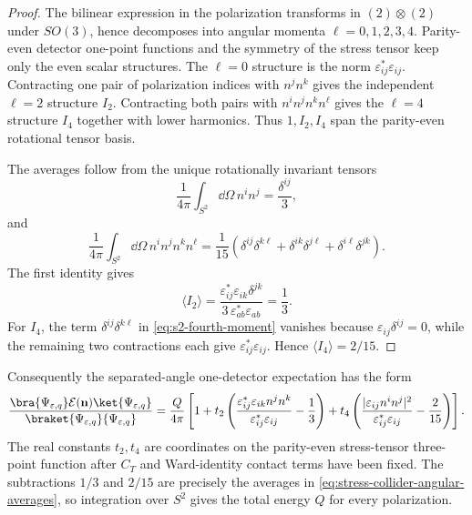 \begin{proof}
The bilinear expression in the polarization transforms in
\((2)\otimes(2)\) under \(SO(3)\), hence decomposes into angular momenta
\(\ell=0,1,2,3,4\).  Parity-even detector one-point functions and the
symmetry of the stress tensor keep only the even scalar structures.  The
\(\ell=0\) structure is the norm
\(\varepsilon^*_{ij}\varepsilon_{ij}\).  Contracting one pair of
polarization indices with \(n^jn^k\) gives the independent \(\ell=2\)
structure \(I_2\).  Contracting both pairs with \(n^in^j n^k n^\ell\) gives
the \(\ell=4\) structure \(I_4\) together with lower harmonics.  Thus
\(1,I_2,I_4\) span the parity-even rotational tensor basis.

The averages follow from the unique rotationally invariant tensors
\[
  \frac{1}{4\pi}\int_{S^2}\dd\Omega\, n^i n^j=\frac{\delta^{ij}}{3},
\]
and
\begin{equation}
  \frac{1}{4\pi}\int_{S^2}\dd\Omega\, n^i n^j n^k n^\ell
  =
  \frac{1}{15}
  \left(
    \delta^{ij}\delta^{k\ell}
    +\delta^{ik}\delta^{j\ell}
    +\delta^{i\ell}\delta^{jk}
  \right).
  \label{eq:s2-fourth-moment}
\end{equation}
The first identity gives
\[
  \langle I_2\rangle
  =
  \frac{\varepsilon^*_{ij}\varepsilon_{ik}\delta^{jk}}
       {3\,\varepsilon^*_{ab}\varepsilon_{ab}}
  =
  \frac13 .
\]
For \(I_4\), the term
\(\delta^{ij}\delta^{k\ell}\) in \eqref{eq:s2-fourth-moment} vanishes because
\(\varepsilon_{ij}\delta^{ij}=0\), while the remaining two contractions each
give \(\varepsilon^*_{ij}\varepsilon_{ij}\).  Hence
\(\langle I_4\rangle=2/15\).
\end{proof}

Consequently the separated-angle one-detector expectation has the form
\begin{equation}
  \frac{\bra{\Psi_{\varepsilon,q}}\mathcal E(\mathbf n)
  \ket{\Psi_{\varepsilon,q}}}
  {\braket{\Psi_{\varepsilon,q}}{\Psi_{\varepsilon,q}}}
  =
  \frac{Q}{4\pi}
  \left[
    1
    +t_2
    \left(
      \frac{\varepsilon^*_{ij}\varepsilon_{ik}n^jn^k}
           {\varepsilon^*_{ij}\varepsilon_{ij}}
      -\frac13
    \right)
    +t_4
    \left(
      \frac{|\varepsilon_{ij}n^in^j|^2}
           {\varepsilon^*_{ij}\varepsilon_{ij}}
      -\frac{2}{15}
    \right)
  \right].
  \label{eq:hm-energy-one-point}
\end{equation}
The real constants \(t_2,t_4\) are coordinates on the parity-even
stress-tensor three-point function after \(C_T\) and Ward-identity contact
terms have been fixed.  The subtractions \(1/3\) and \(2/15\) are precisely
the averages in \eqref{eq:stress-collider-angular-averages}, so integration
over \(S^2\) gives the total energy \(Q\) for every polarization.


